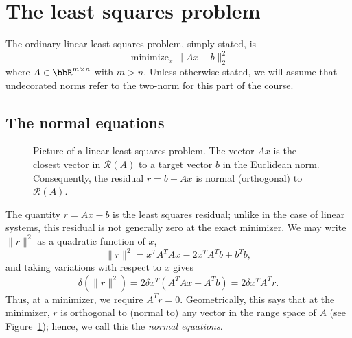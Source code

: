 \section{The least squares problem}

The ordinary linear least squares problem, simply stated, is
\[
  \operatorname{minimize}_x \|Ax-b\|_2^2
\]
where $A \in \bbR^{m \times n}$ with $m > n$.
Unless otherwise stated, we will assume that undecorated norms
refer to the two-norm for this part of the course.

\subsection{The normal equations}

\begin{figure}
  \begin{center}
  \end{center}
  \caption{Picture of a linear least squares problem.  The vector $Ax$
           is the closest vector in $\mathcal{R}(A)$ to a target
           vector $b$ in the Euclidean norm.  Consequently, the
           residual $r = b-Ax$ is normal (orthogonal) to
           $\mathcal{R}(A)$.}
  \label{fig1}
\end{figure}

The quantity
$r = Ax-b$ is the least squares residual; unlike in the case of
linear systems, this residual is not generally zero at the exact
minimizer.  We may write $\|r\|^2$ as a quadratic function of $x$,
\[
  \|r\|^2 = x^T A^T A x - 2 x^T A^T b + b^T b,
\]
and taking variations with respect to $x$ gives
\[
  \delta (\|r\|^2) = 2 \delta x^T (A^T A x - A^T b) = 2 \delta x^T A^T r.
\]
Thus, at a minimizer, we require $A^T r = 0$.  Geometrically, this says
that at the minimizer, $r$ is orthogonal to (normal to) any vector
in the range space of $A$ (see Figure~\ref{fig1}); hence, we call this the {\em normal equations}.

